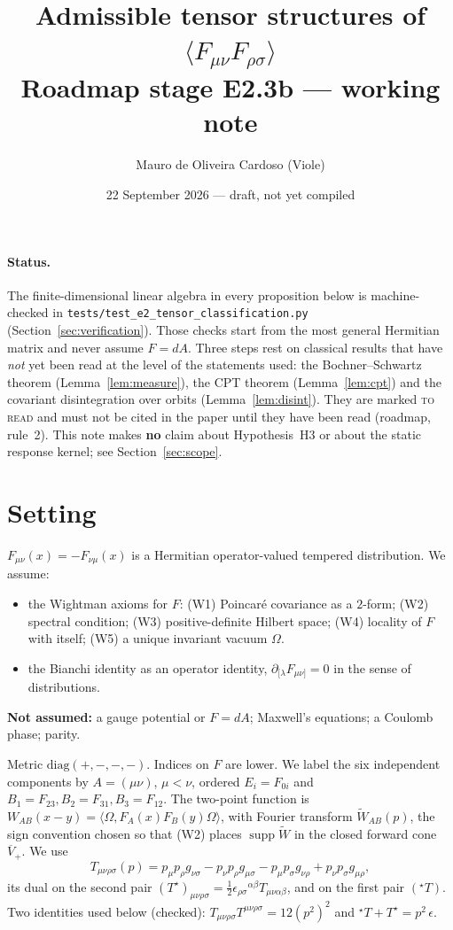 \documentclass[11pt]{article}
\title{Admissible tensor structures of $\langle F_{\mu\nu}F_{\rho\sigma}\rangle$\\
\large Roadmap stage E2.3b --- working note}
\author{Mauro de Oliveira Cardoso (Viole)}
\date{22 September 2026 --- draft, not yet compiled}
\theoremstyle{remark}
\newcommand{\Wt}{\widetilde W}
\newcommand{\Tt}{T}
\newcommand{\dual}{{\star}}
\begin{document}
\maketitle

\paragraph{Status.}
The finite-dimensional linear algebra in every proposition below is
machine-checked in \texttt{tests/test\_e2\_tensor\_classification.py}
(Section~\ref{sec:verification}). Those checks start from the most general
Hermitian matrix and never assume $F=dA$. Three steps rest on classical results
that have \emph{not} yet been read at the level of the statements used: the
Bochner--Schwartz theorem (Lemma~\ref{lem:measure}), the CPT theorem
(Lemma~\ref{lem:cpt}) and the covariant disintegration over orbits
(Lemma~\ref{lem:disint}). They are marked \textsc{to read} and must not be
cited in the paper until they have been read (roadmap, rule~2). This note makes
\textbf{no} claim about Hypothesis~H3 or about the static response kernel; see
Section~\ref{sec:scope}.

\section{Setting}

$F_{\mu\nu}(x)=-F_{\nu\mu}(x)$ is a Hermitian operator-valued tempered
distribution. We assume:
\begin{itemize}
\item[(W)] the Wightman axioms for $F$: (W1) Poincar\'e covariance as a
  $2$-form; (W2) spectral condition; (W3) positive-definite Hilbert space;
  (W4) locality of $F$ with itself; (W5) a unique invariant vacuum $\Omega$.
\item[(B)] the Bianchi identity as an operator identity,
  $\partial_{[\lambda}F_{\mu\nu]}=0$ in the sense of distributions.
\end{itemize}
\textbf{Not assumed:} a gauge potential or $F=dA$; Maxwell's equations; a
Coulomb phase; parity.

Metric $\mathrm{diag}(+,-,-,-)$. Indices on $F$ are lower. We label the six
independent components by $A=(\mu\nu)$, $\mu<\nu$, ordered
$E_i=F_{0i}$ and $B_1=F_{23},B_2=F_{31},B_3=F_{12}$. The two-point function
is $W_{AB}(x-y)=\langle\Omega,F_A(x)F_B(y)\Omega\rangle$, with Fourier transform
$\Wt_{AB}(p)$, the sign convention chosen so that (W2) places
$\operatorname{supp}\Wt$ in the closed forward cone $\overline V_+$. We use
\begin{equation}
\Tt_{\mu\nu\rho\sigma}(p)=p_\mu p_\rho g_{\nu\sigma}-p_\nu p_\rho g_{\mu\sigma}
-p_\mu p_\sigma g_{\nu\rho}+p_\nu p_\sigma g_{\mu\rho},
\end{equation}
its dual on the second pair
$(\Tt^{\dual})_{\mu\nu\rho\sigma}=\tfrac12\epsilon_{\rho\sigma}{}^{\alpha\beta}\Tt_{\mu\nu\alpha\beta}$,
and on the first pair $({}^{\dual}\Tt)$. Two identities used below (checked):
$\Tt_{\mu\nu\rho\sigma}\Tt^{\mu\nu\rho\sigma}=12(p^2)^2$ and
${}^{\dual}\Tt+\Tt^{\dual}=p^2\,\epsilon$.
\end{document}
